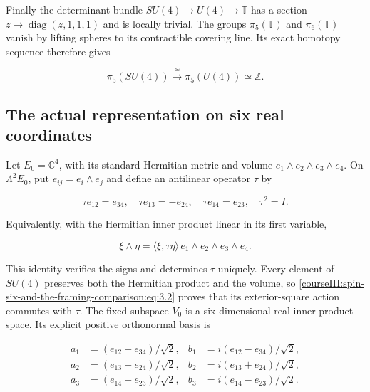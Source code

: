 Finally the determinant bundle \(SU(4)\to U(4)\to\mathbb T\) has a section \(z\mapsto\operatorname{diag}(z,1,1,1)\) and is locally trivial. The groups \(\pi_5(\mathbb T)\) and \(\pi_6(\mathbb T)\) vanish by lifting spheres to its contractible covering line. Its exact homotopy sequence therefore gives

\begin{equation}
\pi_5(SU(4))\xrightarrow{\ \simeq\ }\pi_5(U(4))\simeq\mathbb Z.
\label{courseIII:spin-six-and-the-framing-comparison:eq:2.8}
\end{equation}

\subsection{The actual representation on six real coordinates}
\label{courseIII:spin-six-and-the-framing-comparison:framing-su4-so6}

\label{courseIII:spin-six-and-the-framing-comparison:section-3}\label{courseIII:spin6:3}

Let \(E_0=\mathbb C^4\), with its standard Hermitian metric and volume \(e_1\wedge e_2\wedge e_3\wedge e_4\). On \(\Lambda^2E_0\), put \(e_{ij}=e_i\wedge e_j\) and define an antilinear operator \(\tau\) by

\begin{equation}
\tau e_{12}=e_{34},\quad
\tau e_{13}=-e_{24},\quad
\tau e_{14}=e_{23},\quad
\tau^2=I.
\label{courseIII:spin-six-and-the-framing-comparison:eq:3.1}
\end{equation}

Equivalently, with the Hermitian inner product linear in its first variable,

\begin{equation}
\xi\wedge\eta=\langle\xi,\tau\eta\rangle\,
e_1\wedge e_2\wedge e_3\wedge e_4.
\label{courseIII:spin-six-and-the-framing-comparison:eq:3.2}
\end{equation}

This identity verifies the signs and determines \(\tau\) uniquely. Every element of \(SU(4)\) preserves both the Hermitian product and the volume, so \eqref{courseIII:spin-six-and-the-framing-comparison:eq:3.2} proves that its exterior-square action commutes with \(\tau\). The fixed subspace \(V_0\) is a six-dimensional real inner-product space. Its explicit positive orthonormal basis is

\begin{equation}
\begin{aligned}
a_1&=(e_{12}+e_{34})/\sqrt2,&
b_1&=i(e_{12}-e_{34})/\sqrt2,\\
a_2&=(e_{13}-e_{24})/\sqrt2,&
b_2&=i(e_{13}+e_{24})/\sqrt2,\\
a_3&=(e_{14}+e_{23})/\sqrt2,&
b_3&=i(e_{14}-e_{23})/\sqrt2.
\end{aligned}
\label{courseIII:spin-six-and-the-framing-comparison:eq:3.3}
\end{equation}

